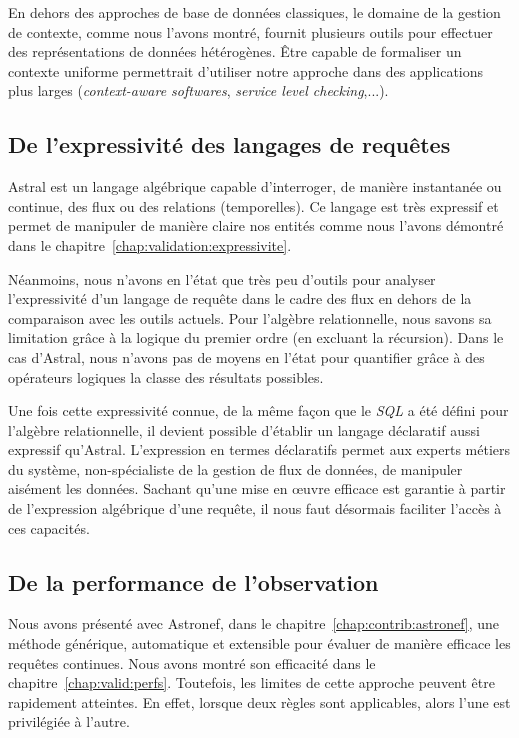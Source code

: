 En dehors des approches de base de données classiques, le domaine de la gestion de contexte, comme nous l'avons montré, fournit plusieurs outils pour effectuer des représentations de données hétérogènes. Être capable de formaliser un contexte uniforme permettrait d'utiliser notre approche dans des applications plus larges (\textit{context-aware softwares}, \textit{service level checking},...).

\subsection{De l'expressivité des langages de requêtes}
Astral est un langage algébrique capable d'interroger, de manière instantanée ou continue, des flux ou des relations (temporelles). Ce langage est très expressif et permet de manipuler de manière claire nos entités comme nous l'avons démontré dans le chapitre~\ref{chap:validation:expressivite}.

Néanmoins, nous n'avons en l'état que très peu d'outils pour analyser l'expressivité d'un langage de requête dans le cadre des flux en dehors de la comparaison avec les outils actuels. Pour l'algèbre relationnelle, nous savons sa limitation grâce à la logique du premier ordre (en excluant la récursion). Dans le cas d'Astral, nous n'avons pas de moyens en l'état pour quantifier grâce à des opérateurs logiques la classe des résultats possibles.

Une fois cette expressivité connue, de la même façon que le \textit{SQL} a été défini pour l'algèbre relationnelle, il devient possible d'établir un langage déclaratif aussi expressif qu'Astral. L'expression en termes déclaratifs permet aux experts métiers du système, non-spécialiste de la gestion de flux de données, de manipuler aisément les données. Sachant qu'une mise en œuvre efficace est garantie à partir de l'expression algébrique d'une requête, il nous faut désormais faciliter l'accès à ces capacités.

\subsection{De la performance de l'observation}
Nous avons présenté avec Astronef, dans le chapitre~\ref{chap:contrib:astronef}, une méthode générique, automatique et extensible pour évaluer de manière efficace les requêtes continues. Nous avons montré son efficacité dans le chapitre~\ref{chap:valid:perfs}. Toutefois, les limites de cette approche peuvent être rapidement atteintes. En effet, lorsque deux règles sont applicables, alors l'une est privilégiée à l'autre.


